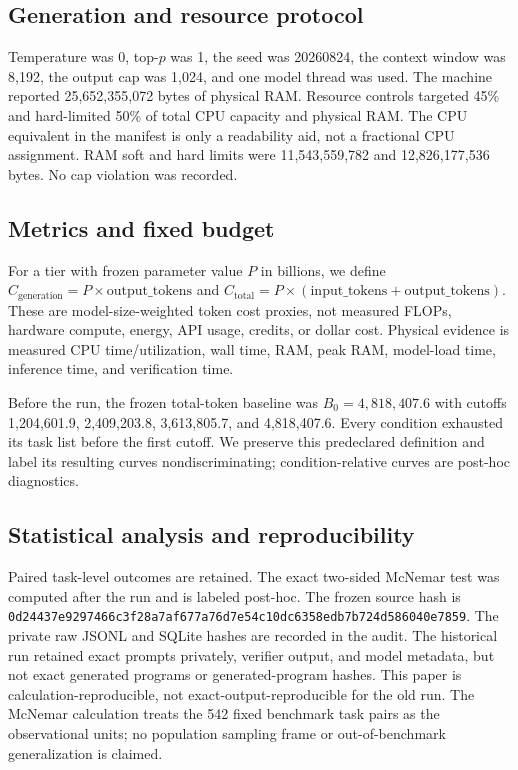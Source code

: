 \documentclass[10pt]{article}
\begin{document}
\subsection{Generation and resource protocol}
Temperature was 0, top-$p$ was 1, the seed was 20260824, the context window
was 8,192, the output cap was 1,024, and one model thread was used. The
machine reported 25,652,355,072 bytes of physical RAM. Resource controls
targeted 45\% and hard-limited 50\% of total CPU capacity and physical RAM.
The CPU equivalent in the manifest is only a readability aid, not a fractional
CPU assignment. RAM soft and hard limits were 11,543,559,782 and
12,826,177,536 bytes. No cap violation was recorded.

\subsection{Metrics and fixed budget}
For a tier with frozen parameter value $P$ in billions, we define
$C_{\mathrm{generation}}=P\times\mathrm{output\_tokens}$ and
$C_{\mathrm{total}}=P\times(\mathrm{input\_tokens}+\mathrm{output\_tokens})$.
These are model-size-weighted token cost proxies, not measured FLOPs,
hardware compute, energy, API usage, credits, or dollar cost. Physical
evidence is measured CPU time/utilization, wall time, RAM, peak RAM,
model-load time, inference time, and verification time.

Before the run, the frozen total-token baseline was $B_0=4,818,407.6$ with
cutoffs 1,204,601.9, 2,409,203.8, 3,613,805.7, and 4,818,407.6. Every
condition exhausted its task list before the first cutoff. We preserve this
predeclared definition and label its resulting curves nondiscriminating;
condition-relative curves are post-hoc diagnostics.

\subsection{Statistical analysis and reproducibility}
Paired task-level outcomes are retained. The exact two-sided McNemar test was
computed after the run and is labeled post-hoc. The frozen source hash is
\texttt{0d24437e9297466c3f28a7af677a76d7e54c10dc6358edb7b724d586040e7859}.
The private raw JSONL and SQLite hashes are recorded in the audit. The
historical run retained exact prompts privately, verifier output, and model
metadata, but not exact generated programs or generated-program hashes.
This paper is calculation-reproducible, not exact-output-reproducible for the
old run.
The McNemar calculation treats the 542 fixed benchmark task pairs as the
observational units; no population sampling frame or out-of-benchmark
generalization is claimed.
\end{document}
